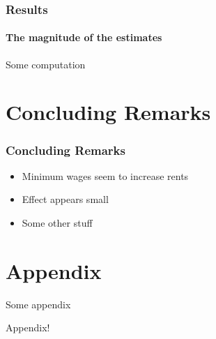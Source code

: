 \documentclass[aspectratio=169]{beamer}
\begin{document}
	\begin{frame}
		\frametitle{Results}
		\framesubtitle{The magnitude of the estimates}
		
		Some computation
		
	\end{frame}
	


\section{Concluding Remarks}


	\begin{frame}
		\frametitle{Concluding Remarks}
		
		\begin{itemize}
			\item Minimum wages seem to increase rents
			\item Effect appears small
			\item Some other stuff			
		\end{itemize}
	\end{frame}



\appendix

\renewcommand\thetable{\thesection.\arabic{table}} 
\renewcommand\thefigure{\thesection.\arabic{figure}} 
\setcounter{table}{0}
\setcounter{figure}{0}

\section{Appendix}

	\begin{frame}{Some appendix}
		
		Appendix!
		
	\end{frame}
\end{document}
